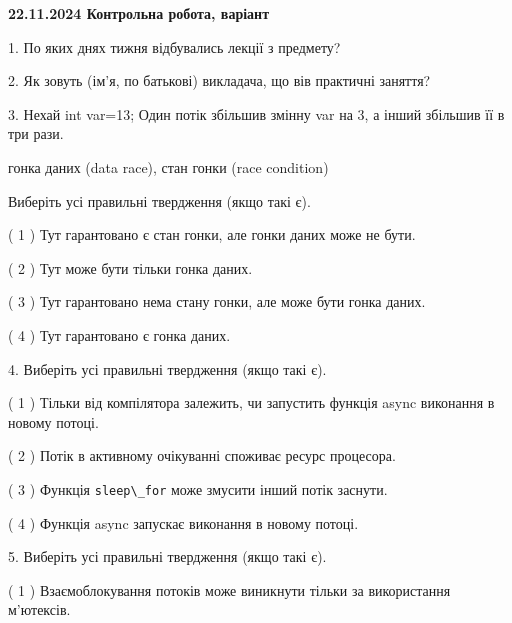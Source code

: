\documentclass[12pt, ukrainian]{article}
\def\code#1{\Verb!#1!}
\begin{document}
\vspace{4mm}
\newpage
\begin {large}

\textbf{22.11.2024 Контрольна робота, варіант  }\par


{
1. По яких днях тижня відбувались лекції з предмету?



\vspace{5mm}
2. Як зовуть (ім'я, по батькові) викладача, що вів практичні заняття?



\vspace{5mm}
3. Нехай int var=13; Один потік збільшив змінну var на 3, а інший збільшив її в три рази.

гонка даних (data race), стан гонки (race condition)

Виберіть усі правильні твердження (якщо такі є).\par
\vspace{2mm}
( 1 ) Тут гарантовано є стан гонки, але гонки даних може не бути.%

( 2 ) Тут може бути тільки гонка даних.%

( 3 ) Тут гарантовано нема стану гонки, але може бути гонка даних.%

( 4 ) Тут гарантовано є гонка даних.%


\vspace{5mm}
4. Виберіть усі правильні твердження (якщо такі є).\par
\vspace{2mm}

( 1 ) Тільки від компілятора залежить, чи запустить функція async виконання в новому потоці.%

( 2 ) Потік в активному очікуванні споживає ресурс процесора.%

( 3 ) Функція \code{sleep\_for} може змусити інший потік заснути.%

( 4 ) Функція async запускає виконання в новому потоці.%


\vspace{5mm}
5. Виберіть усі правильні твердження (якщо такі є).\par
\vspace{2mm}

( 1 ) Взаємоблокування потоків може виникнути тільки за використання м’ютексів.%

}
\end{large}
\end{document}
